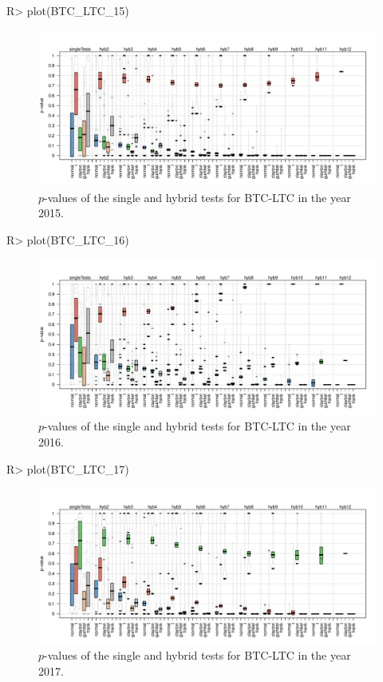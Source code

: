 \begin{example}
R> plot(BTC_LTC_15)
\end{example}
\vspace{-0.75cm}
\begin{figure}[H]
	\centering
 \includegraphics[width=\textwidth]{img/BTC_LTC_15.pdf}
	\caption{$p$-values of the single and hybrid tests for BTC-LTC in the year 2015.}
	\label{Pirateplot_BTC_LTC_15}
\end{figure}
\vspace{0.25cm}
\begin{example}
R> plot(BTC_LTC_16)
\end{example}
\vspace{-0.75cm}
\begin{figure}[H]
	\centering
 \includegraphics[width=\textwidth]{img/BTC_LTC_16.pdf}
	\caption{$p$-values of the single and hybrid tests for BTC-LTC in the year 2016.}
	\label{Pirateplot_BTC_LTC_16}
\end{figure}
\newpage
\begin{example}
R> plot(BTC_LTC_17)
\end{example}
\vspace{-1cm}
\begin{figure}[H]
	\centering
 \includegraphics[width=\textwidth]{img/BTC_LTC_17.pdf}
	\caption{$p$-values of the single and hybrid tests for BTC-LTC in the year 2017.}
	\label{Pirateplot_BTC_LTC_17}
\end{figure}
